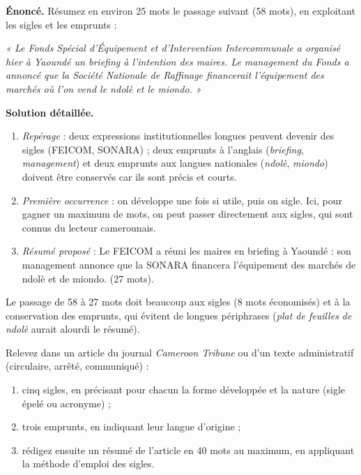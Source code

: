 \documentclass[11pt]{article}
\begin{document}
\begin{exoresolu}
\textbf{Énoncé.} Résumez en environ 25 mots le passage suivant (58 mots), en exploitant les sigles et les emprunts :

\emph{« Le Fonds Spécial d'Équipement et d'Intervention Intercommunale a organisé hier à Yaoundé un briefing à l'intention des maires. Le management du Fonds a annoncé que la Société Nationale de Raffinage financerait l'équipement des marchés où l'on vend le ndolè et le miondo. »}

\tcblower
\textbf{Solution détaillée.}
\begin{enumerate}
\item \emph{Repérage} : deux expressions institutionnelles longues peuvent devenir des sigles (FEICOM, SONARA) ; deux emprunts à l'anglais (\emph{briefing}, \emph{management}) et deux emprunts aux langues nationales (\emph{ndolè}, \emph{miondo}) doivent être conservés car ils sont précis et courts.
\item \emph{Première occurrence} : on développe une fois si utile, puis on sigle. Ici, pour gagner un maximum de mots, on peut passer directement aux sigles, qui sont connus du lecteur camerounais.
\item \emph{Résumé proposé} : \og Le FEICOM a réuni les maires en briefing à Yaoundé : son management annonce que la SONARA financera l'équipement des marchés de ndolè et de miondo. \fg{} (27 mots).
\end{enumerate}
Le passage de 58 à 27 mots doit beaucoup aux sigles (8 mots économisés) et à la conservation des emprunts, qui évitent de longues périphrases (\emph{plat de feuilles de ndolè} aurait alourdi le résumé).
\end{exoresolu}

\begin{exercice}
Relevez dans un article du journal \emph{Cameroon Tribune} ou d'un texte administratif (circulaire, arrêté, communiqué) :
\begin{enumerate}
\item cinq sigles, en précisant pour chacun la forme développée et la nature (sigle épelé ou acronyme) ;
\item trois emprunts, en indiquant leur langue d'origine ;
\item rédigez ensuite un résumé de l'article en 40 mots au maximum, en appliquant la méthode d'emploi des sigles.
\end{enumerate}
\end{exercice}
\end{document}

